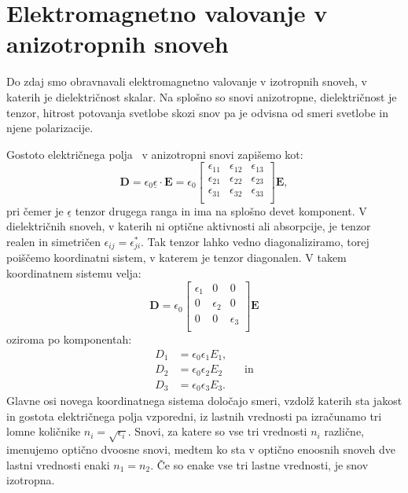 \section{Elektromagnetno valovanje v anizotropnih snoveh}\label{chap:anizotropni}
Do zdaj smo obravnavali elektromagnetno valovanje
v izotropnih snoveh, v katerih je di\-elek\-tri\-čnost skalar. 
Na splošno so snovi anizotropne,
dielektričnost je tenzor, hitrost potovanja svetlobe 
skozi snov pa je odvisna od smeri svetlobe in njene polarizacije.

Gostoto električnega polja~ v anizotropni snovi zapišemo kot:
\begin{equation}
\mathbf{D}=\epsilon_{0}\underline{\epsilon} \cdot\mathbf{E} = 
\epsilon_{0}
\left[\begin{array}{ccc}
\epsilon_{11} & \epsilon_{12}& \epsilon_{13}\\
\epsilon_{21} & \epsilon_{22}& \epsilon_{23}\\
\epsilon_{31} & \epsilon_{32}& \epsilon_{33}\\
\end{array}\right]\!\!\mathbf{E},
\label{eq:gostota-elektricnega-polja-tenzor}
\end{equation}
pri čemer je $\underline{\epsilon}$ tenzor drugega ranga in ima na splošno devet komponent.
V dielektričnih snoveh, v katerih ni optične aktivnosti ali absorpcije, je tenzor
realen in simetričen $\epsilon_{ij}=\epsilon_{ji}^*$. Tak tenzor lahko vedno
diagonaliziramo, torej poiščemo koordinatni sistem, v katerem je tenzor
diagonalen. V takem koordinatnem sistemu velja:
\begin{equation}
\mathbf{D} = \epsilon_{0}
\left[\begin{array}{ccc}
\epsilon_{1} & 0& 0\\
0 & \epsilon_{2}& 0\\
0 & 0& \epsilon_{3}\\
\end{array}\right]\!\!\mathbf{E}
 \label{eq:gostota-elektricnega-polja-lastni}
\end{equation}
oziroma po komponentah:
\begin{align}
D_{1}&=\epsilon_{0}\epsilon_{1}E_{1}, \nonumber \\
D_{2}&=\epsilon_{0}\epsilon_{2}E_{2} \nonumber \qquad \mathrm{in} \\
 D_{3}&=\epsilon_{0}\epsilon_{3}E_{3}.
\end{align}
Glavne osi novega koordinatnega sistema določajo smeri, vzdolž katerih sta jakost
in gostota električnega polja vzporedni, iz lastnih vrednosti 
pa izračunamo tri lomne količnike $n_{i}=\sqrt{\epsilon_{i}}$. Snovi,
za katere so vse tri vrednosti $n_i$ različne, imenujemo optično dvoosne snovi, 
medtem ko sta v optično enoosnih snoveh dve lastni vrednosti enaki $n_{1}=n_{2}$. 
Če so enake vse tri lastne vrednosti, je snov izotropna.

